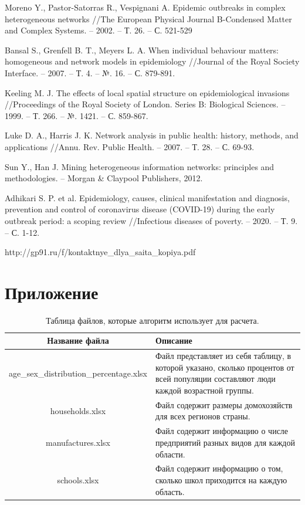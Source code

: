 \documentclass[14pt,a4paper]{article}
\begin{document}
\begin{thebibliography}{99}
	Moreno Y., Pastor-Satorras R., Vespignani A. Epidemic outbreaks in complex heterogeneous networks //The European Physical Journal B-Condensed Matter and Complex Systems. – 2002. – Т. 26. – С. 521-529
	
	Bansal S., Grenfell B. T., Meyers L. A. When individual behaviour matters: homogeneous and network models in epidemiology //Journal of the Royal Society Interface. – 2007. – Т. 4. – №. 16. – С. 879-891.
	
	
	Keeling M. J. The effects of local spatial structure on epidemiological invasions //Proceedings of the Royal Society of London. Series B: Biological Sciences. – 1999. – Т. 266. – №. 1421. – С. 859-867.
	
	Luke D. A., Harris J. K. Network analysis in public health: history, methods, and applications //Annu. Rev. Public Health. – 2007. – Т. 28. – С. 69-93.
	
	Sun Y., Han J. Mining heterogeneous information networks: principles and methodologies. – Morgan \& Claypool Publishers, 2012.

	Adhikari S. P. et al. Epidemiology, causes, clinical manifestation and diagnosis, prevention and control of coronavirus disease (COVID-19) during the early outbreak period: a scoping review //Infectious diseases of poverty. – 2020. – Т. 9. – С. 1-12.

	http://gp91.ru/f/kontaktnye\_dlya\_saita\_kopiya.pdf

\end{thebibliography}


\newpage


\section{Приложение}


\begin{table}[h]
	\centering
	\caption{ Таблица файлов, которые алгоритм использует для расчета.}
	\begin{tabularx}{\textwidth}{|c|X|}
		\hline
		Название файла & Описание \\ 
		\hline
		age\_sex\_distribution\_percentage.xlsx & Файл представляет из себя таблицу, в которой указано, сколько процентов от всей популяции составляют люди каждой возрастной группы. \\ 
		\hline
		households.xlsx & Файл содержит размеры домохозяйств для всех регионов страны. \\ 
		\hline
		manufactures.xlsx & Файл содержит информацию о числе предприятий разных видов для каждой области. \\ 
		\hline
		schools.xlsx & Файл содержит информацию о том, сколько школ приходится на каждую область. \\ 
		\hline
	\end{tabularx}
	\label{fig:file}
\end{table}
\end{document}
